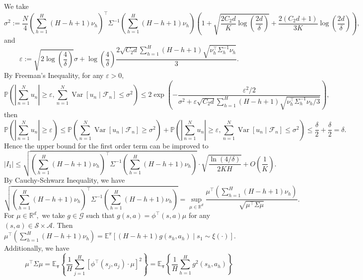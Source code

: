 \documentclass{article}
\numberwithin{equation}{section}
\theoremstyle{plain}
\theoremstyle{definition}
\theoremstyle{remark}
\begin{document}
We take
\begin{equation*}
    \sigma^2 := \frac{N}{4}\left(\sum_{h=1}^{H}(H-h+1) \nu_{h}\right)^{\top} \Sigma^{-1} \left(\sum_{h=1}^{H}(H-h+1) \nu_{h}\right) \left(1+\sqrt{\frac{2 C_{2} d}{K} \log \left(\frac{2 d}{\delta}\right)}+\frac{2\left(C_{2} d + 1\right)}{3 K} \log \left(\frac{2 d}{\delta}\right)\right),
\end{equation*}
and
$$
\varepsilon:=\sqrt{2 \log \left(\frac{4}{\delta}\right)} \sigma+\log \left(\frac{4}{\delta}\right) \frac{2 \sqrt{C_{2} d} \sum_{h=1}^{H}(H-h+1) \sqrt{\nu_{h}^{\top} \Sigma_{h}^{-1} \nu_{h}}}{3}.
$$
By Freeman's Inequality, for any $\varepsilon > 0,$
$$
\mathbb{P}\left(\left|\sum_{n=1}^{N} u_{n}\right| \geq \varepsilon, \sum_{n=1}^{N} \operatorname{Var}\left[u_{n} \mid \mathcal{F}_{n}\right] \leq \sigma^{2}\right) \leq 2 \exp \left(-\frac{\varepsilon^{2} / 2}{\sigma^{2}+\varepsilon \sqrt{C_{2} d} \sum_{h=1}^{H}(H-h+1) \sqrt{\nu_{h}^{\top} \Sigma_{h}^{-1} \nu_{h} / 3}}\right),
$$
then
$$
\mathbb{P}\left(\left|\sum_{n=1}^{N} u_{n}\right| \geq \varepsilon\right) \leq \mathbb{P}\left(\sum_{n=1}^{N} \operatorname{Var}\left[u_{n} \mid \mathcal{F}_{n}\right] \geq \sigma^{2}\right)+\mathbb{P}\left(\left|\sum_{n=1}^{N} u_{n}\right| \geq \varepsilon, \sum_{n=1}^{N} \operatorname{Var}\left[u_{n} \mid \mathcal{F}_{n}\right] \leq \sigma^{2}\right) \leq \frac{\delta}{2}+\frac{\delta}{2}=\delta.
$$
Hence the upper bound for the first order term can be improved to
\begin{equation*}
    \left|I_1\right| \leq \sqrt{\left(\sum_{h=1}^{H}(H-h+1) \nu_{h}\right)^{\top} \Sigma^{-1}\left(\sum_{h=1}^{H}(H-h+1) \nu_{h}\right)} \cdot \sqrt{\frac{\ln (4/ \delta)}{2 K H}} + O(\frac{1}{K}).
\end{equation*}
By Cauchy-Schwarz Inequality, we have
\begin{equation*}
    \sqrt{\left(\sum_{h=1}^{H}(H-h+1) \nu_{h}\right)^{\top} \Sigma^{-1}\left(\sum_{h=1}^{H}(H-h+1) \nu_{h}\right)} = \sup_{\mu \in \mathbb{R}^d} \frac{\mu^{\top} \left(\sum_{h=1}^{H}(H-h+1) \nu_{h}\right)}{\sqrt{\mu^{\top} \Sigma \mu}}.
\end{equation*}
For $\mu \in \mathbb{R}^d,$ we take $g \in \mathcal{G}$ such that $g(s,a) = \phi^{\top}(s,a) \mu$ for any $(s,a) \in \mathcal{S} \times \mathcal{A}.$ Then $\mu^{\top} \left(\sum_{h=1}^{H}(H-h+1) \nu_{h}\right) = \mathbb{E}^{\pi}\left[(H-h+1) g(s_h,a_h) \mid s_1 \sim \xi(\cdot)\right].$ Additionally, we have
\begin{equation*}
    \mu^{\top} \Sigma \mu = \mathbb{E}_{\boldsymbol{\tau}} \left\{\frac{1}{H} \sum_{j=1}^H \left[\phi^{\top}(s_{j}, a_{j}) \cdot \mu\right]^2 \right\} = \mathbb{E}_{\boldsymbol{\tau}} \left\{\frac{1}{H} \sum_{h=1}^H g^2\left(s_h,a_h\right) \right\}
\end{equation*}
\end{document}
